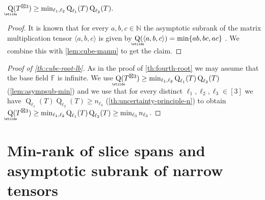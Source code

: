 \documentclass{daj}
\DeclareMathOperator{\subrank}{Q}
\DeclareMathOperator{\asympsubrank}{\underaccent{\wtilde}{Q}}
\newcommand{\FF}{\mathbb{F}}
\newcommand{\NN}{\mathbb{N}}
\begin{document}
\begin{lemma}\label{lem:asympsub-min}
    $\asympsubrank(T^{\boxtimes 3}) \geq \min_{{\ell_1},{\ell_2}} \subrank_{\ell_1}(T) \subrank_{\ell_2}(T).$
\end{lemma}
\begin{proof}
    It is known that for every $a,b,c \in \NN$ the asymptotic subrank of the matrix multiplication tensor $\langle a,b,c\rangle$ is given by $\asympsubrank(\langle a,b,c\rangle) = \min \{ab, bc, ac\}$ \cite[Equation~4.6]{strassen1988asymptotic}. We combine this with \autoref{lem:cube-mamu} to get the claim.
\end{proof}

\begin{proof}[Proof of \autoref{th:cube-root-lb}]
As in the proof of \autoref{th:fourth-root} we may assume that the base field $\FF$ is infinite.
%
%
%
We use $\asympsubrank(T^{\boxtimes 3}) \geq \min_{{\ell_1},{\ell_2}} \subrank_{\ell_1}(T) \subrank_{\ell_2}(T)$ (\autoref{lem:asympsub-min}) and we use that for every distinct ${\ell_1}, {\ell_2}, {\ell_3} \in [3]$ we have $\subrank_{\ell_1}(T)\subrank_{\ell_2}(T) \geq n_{\ell_3}$ (\autoref{th:uncertainty-principle-n}) to obtain
$\asympsubrank(T^{\boxtimes 3}) \geq \min_{{\ell_1},{\ell_2}} \subrank_{\ell_1}(T) \subrank_{\ell_2}(T) \geq \min_{\ell_3} n_{\ell_3}$. %
\end{proof}






%
%
%
%
%
%
%

%
%
%

%


%

%
%
%
%
%
%
%
%
%
%
    
%
    
%

%
%
%
%
%
%
%
%
%


%
%
%

%
%
%
%
%
%
%
%

%
%
%
%
%
%

%
%
%
%
%
%
%
%
%

%
    
%
%

%
%
%
%
%
%

%
%
%
%
%
%
%
%
%



\section{Min-rank of slice spans and asymptotic subrank of narrow tensors} %
%
\label{sec:lower-bound-imbalanced}
\end{document}
